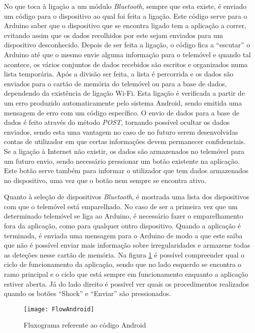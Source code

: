 No que toca à ligação a um módulo \emph{Bluetooth}, sempre que esta existe, é enviado um código para o dispositivo ao qual foi feita a ligação.
Este código serve para o Arduino saber que o dispositivo que se encontra ligado tem a aplicação a correr, evitando assim que os dados recolhidos por este sejam enviados para um dispositivo desconhecido.
Depois de ser feita a ligação, o código fica a ``escutar'' o Arduino até que o mesmo envie alguma informação para o telemóvel e quando tal acontece, os vários conjuntos de dados recebidos são escritos e organizados numa lista temporária.
Após a divisão ser feita, a lista é percorrida e os dados são enviados para o cartão de memória do telemóvel ou para a base de dados, dependendo da existência de ligação Wi-Fi.
Esta ligação é verificada a partir de um erro produzido automaticamente pelo sistema Android, sendo emitida uma mensagem de erro com um código específico.
O envio de dados para a base de dados é feito através do método \emph{POST}, tornando possível ocultar os dados enviados, sendo esta uma vantagem no caso de no futuro serem desenvolvidas contas de utilizador em que certas informações devem permanecer confidenciais.
Se a ligação à Internet não existir, os dados são armazenados no telemóvel para um futuro envio, sendo necessário pressionar um botão existente na aplicação.
Este botão serve também para informar o utilizador que tem dados armazenados no dispositivo, uma vez que o botão nem sempre se encontra ativo.

Quanto à seleção de dispositivos \emph{Bluetooth}, é mostrada uma lista dos dispositivos com que o telemóvel está emparelhado.
No caso de ser a primeira vez que um determinado telemóvel se liga ao Arduino, é necessário fazer o emparelhamento fora da aplicação, como para qualquer outro dispositivo.
Quando a aplicação é terminada, é enviada uma mensagem para o Arduino de modo a que este saiba que não é possível enviar mais informação sobre irregularidades e armazene todas as deteções nesse cartão de memória.
Na figura \ref{fig:Fluxograma_referente_ao_código_android} é possível compreender qual o ciclo de funcionamento da aplicação, sendo que no lado esquerdo se encontra o ramo principal e o ciclo que está sempre em funcionamento enquanto a aplicação estiver aberta.
Já do lado direito é possível ver quais os procedimentos realizados quando os botões ``Shock'' e ``Enviar'' são pressionados.

\begin{figure}[hbtp]
	\centering
	\texttt{[image: FlowAndroid]}
	\caption{Fluxograma referente ao código Android}
	\label{fig:Fluxograma_referente_ao_código_android}
\end{figure}


